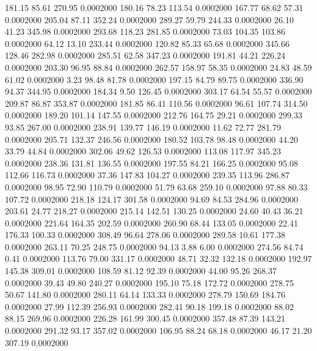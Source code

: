  181.15   85.61  270.95   0.0002000
 180.16   78.23  113.54   0.0002000
 167.77   68.62   57.31   0.0002000
 205.04   87.11  352.24   0.0002000
 289.27   59.79  244.33   0.0002000
  26.10   41.23  345.98   0.0002000
 293.68  118.23  281.85   0.0002000
  73.03  104.35  103.86   0.0002000
  64.12   13.10  233.44   0.0002000
 120.82   85.33   65.68   0.0002000
 345.66  128.46  282.98   0.0002000
 285.51   62.58  347.23   0.0002000
 191.81   44.21  226.24   0.0002000
 203.30   96.95   88.84   0.0002000
 262.57  158.97   58.35   0.0002000
  24.83   48.59   61.02   0.0002000
   3.23   98.48   81.78   0.0002000
 197.15   84.79   89.75   0.0002000
 336.90   94.37  344.95   0.0002000
 184.34    9.50  126.45   0.0002000
 303.17   64.54   55.57   0.0002000
 209.87   86.87  353.87   0.0002000
 181.85   86.41  110.56   0.0002000
  96.61  107.74  314.50   0.0002000
 189.20  101.14  147.55   0.0002000
 212.76  164.75   29.21   0.0002000
 299.33   93.85  267.00   0.0002000
 238.91  139.77  146.19   0.0002000
  11.62   72.77  281.79   0.0002000
 205.71  132.37  246.56   0.0002000
 180.52  103.78   98.48   0.0002000
  44.20   33.79   44.84   0.0002000
 302.06   49.62  126.53   0.0002000
 113.08  117.97  345.23   0.0002000
 238.36  131.81  136.55   0.0002000
 197.55   84.21  166.25   0.0002000
  95.08  112.66  116.73   0.0002000
  37.36  147.83  104.27   0.0002000
 239.35  113.96  286.87   0.0002000
  98.95   72.90  110.79   0.0002000
  51.79   63.68  259.10   0.0002000
  97.88   80.33  107.72   0.0002000
 218.18  124.17  301.58   0.0002000
  94.69   84.53  284.96   0.0002000
 203.61   24.77  218.27   0.0002000
 215.14  142.51  130.25   0.0002000
  24.60   40.43   36.21   0.0002000
 221.64  164.35  202.59   0.0002000
 260.90   68.44  133.05   0.0002000
  22.41  176.33  100.33   0.0002000
 308.49   96.64  278.06   0.0002000
 289.58   10.61  177.38   0.0002000
 263.11   70.25  248.75   0.0002000
  94.13    3.88    6.00   0.0002000
 274.56   84.74    0.41   0.0002000
 113.76   79.00  331.17   0.0002000
  48.71   32.32  132.18   0.0002000
 192.97  145.38  309.01   0.0002000
 108.59   81.12   92.39   0.0002000
  44.00   95.26  268.37   0.0002000
  39.43   49.80  240.27   0.0002000
 195.10   75.18  172.72   0.0002000
 278.75   50.67  141.80   0.0002000
 280.11   64.14  133.33   0.0002000
 278.79  150.69  184.76   0.0002000
  27.99  112.39  256.93   0.0002000
 282.41   90.18  199.18   0.0002000
  88.02   88.15  269.96   0.0002000
 226.28  161.99  300.45   0.0002000
 357.48   87.39  143.21   0.0002000
 291.32   93.17  357.02   0.0002000
 106.95   88.24   68.18   0.0002000
  46.17   21.20  307.19   0.0002000
